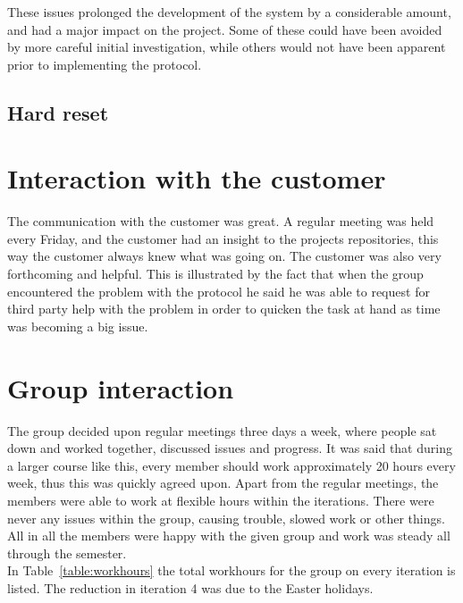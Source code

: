 	These issues prolonged the development of the system by a considerable amount, and had a major impact on the project. Some
	of these could have been avoided by more careful initial investigation, while others would not have been apparent prior to implementing the protocol.

	\subsection{Hard reset}


\section{Interaction with the customer}

	The communication with the customer was great. A regular meeting was held every Friday, and the customer had an insight to the projects repositories, this way the customer always knew what was going on. The customer was also very forthcoming and helpful. This is illustrated by the fact that when the group encountered the problem with the protocol he said he was able to request for third party help with the problem in order to quicken the task at hand as time was becoming a big issue. 



\section{Group interaction}
	The group decided upon regular meetings three days a week, where people sat down and worked together, discussed issues and progress. It was said that during a larger course like this, every member should work approximately 20 hours every week, thus this was quickly agreed upon. Apart from the regular meetings, the members were able to work at flexible hours within the iterations. There were never any issues within the group, causing trouble, slowed work or other things. All in all the members were happy with the given group and work was steady all through the semester.\\ 
	In Table~\ref{table:workhours} the total workhours for the group on every iteration is listed. The reduction in iteration 4 was due to the Easter holidays.

